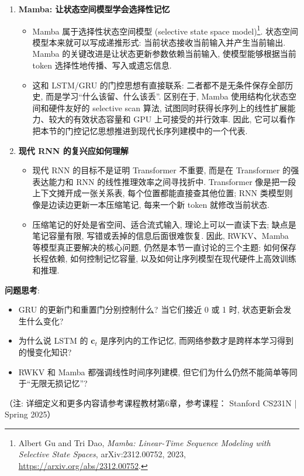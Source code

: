 \documentclass{../nndlcourse}
\begin{document}
\begin{enumerate}
\item \textbf{Mamba: 让状态空间模型学会选择性记忆}
  \begin{itemize}
    \item Mamba 属于选择性状态空间模型 (selective state space model)\footnote{Albert Gu and Tri Dao, \textit{Mamba: Linear-Time Sequence Modeling with Selective State Spaces}, arXiv:2312.00752, 2023, \url{https://arxiv.org/abs/2312.00752}.}. 状态空间模型本来就可以写成递推形式: 当前状态接收当前输入并产生当前输出. Mamba 的关键改进是让状态更新参数依赖当前输入, 使模型能够根据当前 token 选择性地传播、写入或遗忘信息.
    \item 这和 LSTM/GRU 的门控思想有直接联系: 二者都不是无条件保存全部历史, 而是学习“什么该留、什么该丢”. 区别在于, Mamba 使用结构化状态空间和硬件友好的 selective scan 算法, 试图同时获得长序列上的线性扩展能力、较大的有效状态容量和 GPU 上可接受的并行效率. 因此, 它可以看作把本节的门控记忆思想推进到现代长序列建模中的一个代表.
  \end{itemize}

\item \textbf{现代 RNN 的复兴应如何理解}
  \begin{itemize}
    \item 现代 RNN 的目标不是证明 Transformer 不重要, 而是在 Transformer 的强表达能力和 RNN 的线性推理效率之间寻找折中. Transformer 像是把一段上下文摊开成一张关系表, 每个位置都能直接查其他位置; RNN 类模型则像是边读边更新一本压缩笔记, 每来一个新 token 就修改当前状态.
    \item 压缩笔记的好处是省空间、适合流式输入, 理论上可以一直读下去; 缺点是笔记容量有限, 写错或丢掉的信息后面很难恢复. 因此, RWKV、Mamba 等模型真正要解决的核心问题, 仍然是本节一直讨论的三个主题: 如何保存长程依赖, 如何控制记忆容量, 以及如何让序列模型在现代硬件上高效训练和推理.
  \end{itemize}
\end{enumerate}

\textbf{问题思考}:
\begin{itemize}
  \item GRU 的更新门和重置门分别控制什么? 当它们接近 0 或 1 时, 状态更新会发生什么变化?
  \item 为什么说 LSTM 的 $\boldsymbol{c}_t$ 是序列内的工作记忆, 而网络参数才是跨样本学习得到的慢变化知识?
  \item RWKV 和 Mamba 都强调线性时间序列建模, 但它们为什么仍然不能简单等同于“无限无损记忆”?
\end{itemize}

（注: 详细定义和更多内容请参考课程教材第6章，参考课程： Stanford CS231N | Spring 2025）
\end{document}
